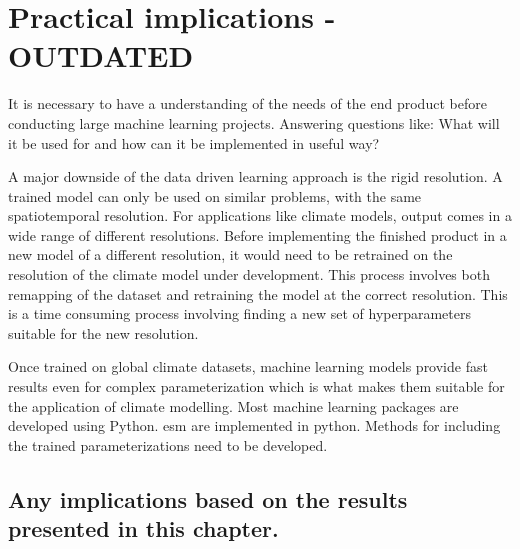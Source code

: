 \section{Practical implications - OUTDATED} \label{sec:practical_implications}
It is necessary to have a understanding of the needs of the end product before conducting large machine learning projects. Answering questions like: What will it be used for and how can it be implemented in useful way?

A major downside of the data driven learning approach is the rigid resolution. A trained model can only be used on similar problems, with the same spatiotemporal resolution. For applications like climate models, output comes in a wide range of different resolutions. Before implementing the finished product in a new model of a different resolution, it would need to be retrained on the resolution of the climate model under development. This process involves both remapping of the dataset and retraining the model at the correct resolution. This is a time consuming process involving finding a new set of hyperparameters suitable for the new resolution. %

Once trained on global climate datasets, machine learning models provide fast results even for complex parameterization which is what makes them suitable for the application of climate modelling. Most machine learning packages are developed using Python. \acrfull{esm} are implemented in python. Methods for including the trained parameterizations need to be developed.
 
\subsection{Any implications based on the results presented in this chapter.}
